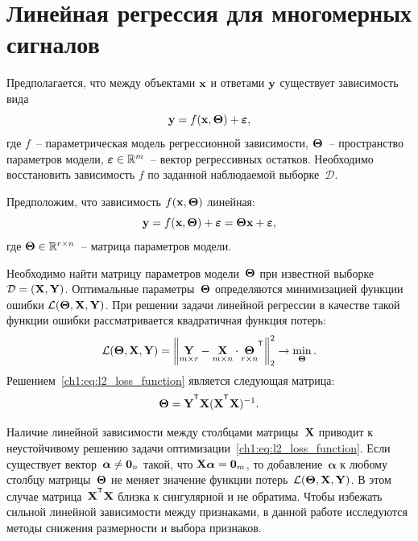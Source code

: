 \section{Линейная регрессия для многомерных сигналов}
\label{ch1:sec_lin_reg}

Предполагается, что между объектами $\mathbf{x}$ и ответами $\mathbf{y}$ существует зависимость вида
\begin{equation}
	\mathbf{y} = f(\mathbf{x}, \boldsymbol{\Theta}) + \boldsymbol{\varepsilon},
	\label{ch1:eq:reg_model}
\end{equation}
где $f$~-- параметрическая модель регрессионной зависимости, $\boldsymbol{\Theta}$~-- пространство параметров модели, $\boldsymbol{\varepsilon} \in \mathbb{R}^{m}$~-- вектор регрессивных остатков. 
Необходимо восстановить зависимость $f$ по заданной наблюдаемой выборке~$\mathcal{D}$.

Предположим, что зависимость $f(\mathbf{x}, \boldsymbol{\Theta})$ линейная:
\begin{equation}
	\mathbf{y} = f(\mathbf{x}, \boldsymbol{\Theta}) + \boldsymbol{\varepsilon} = \boldsymbol{\Theta} \mathbf{x}+ \boldsymbol{\varepsilon},
	\label{ch1:eq:lin_reg_model}
\end{equation}
\noindent где $\boldsymbol{\Theta} \in \mathbb{R}^{r \times n}$~-- матрица параметров модели.

Необходимо найти матрицу параметров модели~$\boldsymbol{\Theta}$ при известной выборке~$\mathcal{D} = \left( \mathbf{X}, \mathbf{Y} \right)$.
Оптимальные параметры~$\boldsymbol{\Theta}$ определяются минимизацией функции ошибки $\mathcal{L}(\boldsymbol{\Theta}, \mathbf{X}, \mathbf{Y})$.
При решении задачи линейной регрессии в качестве такой функции ошибки рассматривается квадратичная функция потерь:
\begin{equation}
	\cL(\bTheta, \bX, \bY) = {\left\| \underset{m \times r}{\mathbf{Y}}  - \underset{m \times n}{\bX} \cdot \underset{r \times n}{\bTheta}^{\T} \right\| }_2^2 \rightarrow\min_{\bTheta}.
	\label{ch1:eq:l2_loss_function}
\end{equation}
Решением~\eqref{ch1:eq:l2_loss_function} является следующая матрица:
\begin{equation*}
	\bTheta = \bY^{\T} \bX (\bX^{\T} \bX)^{-1}.
\end{equation*}

Наличие линейной зависимости между столбцами матрицы~$\mathbf{X}$ приводит к неустойчивому решению задачи оптимизации~\eqref{ch1:eq:l2_loss_function}.
Если существует вектор~$\boldsymbol{\alpha} \neq \boldsymbol{0}_n$ такой, что $\mathbf{X} \boldsymbol{\alpha}= \boldsymbol{0}_m$, то добавление~$\boldsymbol{\alpha}$ к любому столбцу матрицы~$\boldsymbol{\Theta}$ не меняет значение функции потерь~$\mathcal{L}(\boldsymbol{\Theta}, \mathbf{X}, \mathbf{Y})$.
В этом случае матрица~$\bX^{\T} \bX$ близка к сингулярной и не обратима.
Чтобы избежать сильной линейной зависимости между признаками, в данной работе исследуются методы снижения размерности и выбора признаков.


